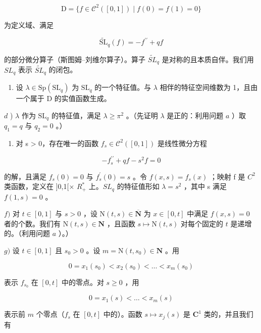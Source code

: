 \[
\mathrm{D} = \{f \in \mathcal {C} ^ {2} ([ 0, 1 ]) \mid f (0) = f (1) = 0 \}
\]

为定义域、满足

\[
\widetilde {\mathrm{SL}} _ {q} (f) = - f ^ {\prime \prime} + q f
\]

的部分微分算子（斯图姆–刘维尔算子）。算子 \(\widetilde{SL}_{q}\) 是对称的且本质自伴。我们用 \(SL_{q}\) 表示 \(\widetilde{SL}_{q}\) 的闭包。

\begin{enumerate}
\def\labelenumi{\alph{enumi})}
\setcounter{enumi}{2}
\tightlist
\item
  设 \(\lambda \in \mathrm{Sp}(\mathrm{SL}_q)\) 为 \(\mathrm{SL}_q\) 的一个特征值。与 \(\lambda\) 相伴的特征空间维数为 1，且由一个属于 D 的实值函数生成。
\end{enumerate}

\(d\) ) \(\lambda\) 作为 \(\mathrm{SL}_q\) 的特征值，满足 \(\lambda \geqslant \pi^2\) 。（先证明 \(\lambda\) 是正的：利用问题 \(a\) ）取 \(q_{1} = q\) 与 \(q_{2} = 0\) 。）

\begin{enumerate}
\def\labelenumi{\alph{enumi})}
\setcounter{enumi}{4}
\tightlist
\item
  对 s \textgreater{} 0，存在唯一的函数 \(f_{s} \in \mathcal{C}^{2}([0,1])\) 是线性微分方程
\end{enumerate}

\[
- f _ {s} ^ {\prime \prime} + q f - s ^ {2} f = 0
\]

的解，且满足 \(f_{s}(0)=0\) 与 \(f_{s}^{\prime}(0)=s\) 。令 \(f(x,s)=f_{s}(x)\) ；映射 f 是 \(C^{2}\) 类函数，定义在 {]}0,1{[}× \(R_{+}^{*}\) 上。\(SL_{q}\) 的特征值形如 \(\lambda=s^{2}\) ，其中 s 满足 \(f(1,s)=0\) 。

\(f)\) 对 \(t \in [0,1]\) 与 \(s > 0\) ，设 \(\mathrm{N}(t,s) \in \overline{\mathbf{N}}\) 为 \(x \in [0,t]\) 中满足 \(f(x,s) = 0\) 者的个数。我们有 \(\mathrm{N}(t,s) \in \mathbf{N}\) ，且函数 \(s \mapsto \mathrm{N}(t,s)\) 对每个固定的 \(t\) 是递增的。（利用问题 \(a\) ）。）

\(g)\) 设 \(t \in [0,1]\) 且 \(s_0 > 0\) 。设 \(m = \mathrm{N}(t,s_0) \in \mathbf{N}\) 。用

\[
0 = x _ {1} (s _ {0}) <   x _ {2} (s _ {0}) <   \dots <   x _ {m} (s _ {0})
\]

表示 \(f_{s_0}\) 在 \([0,t]\) 中的零点。对 \(s \geqslant 0\) ，用

\[
0 = x _ {1} (s) <   \dots <   x _ {m} (s)
\]

表示前 \(m\) 个零点（\(f_{s}\) 在 \([0,t]\) 中的）。函数 \(s\mapsto x_{j}(s)\) 是 \(\mathbf{C}^1\) 类的，并且我们有

